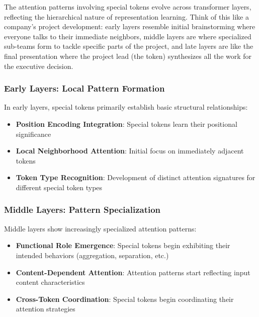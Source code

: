 The attention patterns involving special tokens evolve across transformer layers, reflecting the hierarchical nature of representation learning. Think of this like a company's project development: early layers resemble initial brainstorming where everyone talks to their immediate neighbors, middle layers are where specialized sub-teams form to tackle specific parts of the project, and late layers are like the final presentation where the project lead (the \cls{} token) synthesizes all the work for the executive decision.
\begin{comment}
Feedback: This section is excellent. The breakdown into early, middle, and late layers is very clear. To make it even more memorable, you could use a consistent analogy, like a company's project team. Early layers are like the initial brainstorming where everyone talks to their neighbors. Middle layers are where sub-teams form to tackle specific parts of the project. Late layers are like the final presentation where the project lead ([CLS] token) synthesizes all the work for the final decision.

STATUS: addressed - added consistent project team analogy throughout the layer evolution section
\end{comment}

\subsubsection{Early Layers: Local Pattern Formation}

In early layers, special tokens primarily establish basic structural relationships:
\begin{itemize}
\item \textbf{Position Encoding Integration}: Special tokens learn their positional significance
\item \textbf{Local Neighborhood Attention}: Initial focus on immediately adjacent tokens
\item \textbf{Token Type Recognition}: Development of distinct attention signatures for different special token types
\end{itemize}

\subsubsection{Middle Layers: Pattern Specialization}

Middle layers show increasingly specialized attention patterns:
\begin{itemize}
\item \textbf{Functional Role Emergence}: Special tokens begin exhibiting their intended behaviors (aggregation, separation, etc.)
\item \textbf{Content-Dependent Attention}: Attention patterns start reflecting input content characteristics
\item \textbf{Cross-Token Coordination}: Special tokens begin coordinating their attention strategies
\end{itemize}

